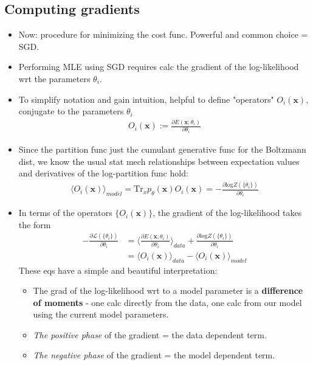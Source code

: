 \documentclass[norsk,a4paper,11pt]{article}
\begin{document}
\subsection{Computing gradients}
\begin{itemize}
	\item Now: procedure for minimizing the cost func. Powerful and common choice = SGD.
	\item Performing MLE using SGD requires calc the gradient of the log-likelihood wrt the parameters $\theta_i$. 
	\item To simplify notation and gain intuition, helpful to define "operators" $O_i(\bm{x})$, conjugate to the parameters $\theta_i$
	\begin{align}
		O_i(\bm{x}) := \frac{\partial E(\bm{x}; \theta_i)}{\partial \theta_i}
	\end{align}
	\item Since the partition func just the cumulant generative func for the Boltzmann dist, we know the usual stat mech relationships between expectation values and derivatives of the log-partition func hold:
	\begin{align}
		\langle O_i(\bm{x}) \rangle_{model} = \text{Tr}_x p_\theta (\bm{x}) O_i (\bm{x}) = - \frac{\partial \text{log} Z(\{ \theta_i \})}{\partial \theta_i}
	\end{align}
	\item In terms of the operators $\{ O_i(\bm{x}) \}$, the gradient of the log-likelihood takes the form
	\begin{align}
		- \frac{\partial \mathcal{L} (\{ \theta_i \})}{\partial \theta_i}
		&= \langle \frac{\partial E(\bm{x}; \theta_i)}{\partial \theta_i} \rangle_{data} + \frac{\partial \text{log} Z(\{ \theta_i \})}{\partial \theta_i} \nonumber \\
		&=  \langle O_i(\bm{x}) \rangle_{data} - \langle O_i (\bm{x}) \rangle_{model}
	\end{align}
	These eqs have a simple and beautiful interpretation:
	\begin{itemize}
		\item The grad of the log-likelihood wrt to a model parameter is a \textbf{difference of moments} - one calc directly from the data, one calc from our model using the current model parameters.
		\item \textit{The positive phase} of the gradient = the data dependent term. 
		\item \textit{The negative phase} of the gradient = the model dependent term.
	\end{itemize}

\end{itemize}
\end{document}
